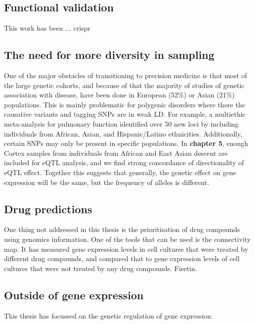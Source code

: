\subsection{Functional validation}
This work has been ... crispr

\subsection{The need for more diversity in sampling}
One of the major obstacles of transitioning to precision medicine is that most of the large genetic cohorts, and because of that the majority of studies of genetic association with disease, have been done in European (52\%) or Asian (21\%) populations\cite{sirugoMissingDiversityHuman2019}. This is mainly problematic for polygenic disorders where there the causative variants and tagging SNPs are in weak LD\cite{sirugoMissingDiversityHuman2019}. For example, a multiethic meta-analysis for pulmonary function identified over 50 new loci by including individuals from African, Asian, and Hispanic/Latino ethnicities\cite{wyssMultiethnicMetaanalysisIdentifies2018}.  Additionally, certain SNPs may only be present in specific populations\cite{adalsteinsdottirberglindNationwideStudyHypertrophic2014}.  In \textbf{chapter 5}, enough Cortex samples from individuals from African and East Asian descent are included for eQTL analysis, and we find strong concordance of directionality of eQTL effect. Together this suggests that generally, the genetic effect on gene expression will be the same, but the frequency of alleles is different. 

\subsection{Drug predictions}
One thing not addressed in this thesis is the prioritisation of drug compounds using genomics information. One of the tools that can be used is the connectivity map\cite{lambConnectivityMapUsing2006}. It has measured gene expression levels in cell cultures that were treated by different drug compounds, and compared that to gene expression levels of cell cultures that were not treated by any drug compounds. Fisetin\cite{gibbsHumanGenomeProject2020}.

\subsection{Outside of gene expression}
This thesis has focussed on the genetic regulation of gene expression. 

